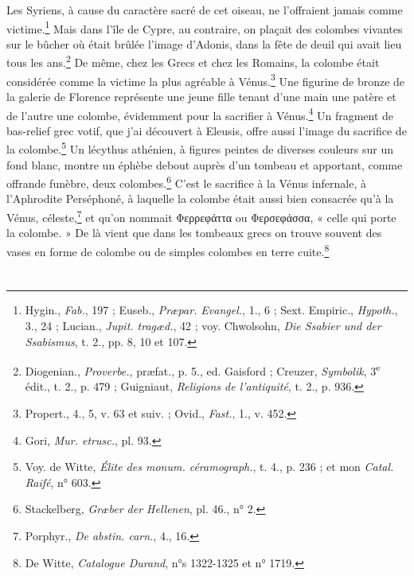 \documentclass[a4paper, 11pt, oneside]{article}
\begin{document}
Les Syriens, à cause du caractère sacré de cet oiseau, ne l'offraient jamais comme victime.\footnote{Hygin., \emph{Fab.}, 197 ; Euseb., \emph{Præpar. Evangel.}, 1., 6 ; Sext. Empiric., \emph{Hypoth.}, 3., 24 ; Lucian., \emph{Jupit. tragæd.}, 42 ; voy. Chwolsohn, \emph{Die Ssabier und der Ssabismus}, t. 2., pp. 8, 10 et 107.} Mais dans l'île de Cypre, au contraire, on plaçait des colombes vivantes sur le bûcher où était brûlée l'image d'Adonis, dans la fête de deuil qui avait lieu tous les ans.\footnote{Diogenian., \emph{Proverbe.}, præfat., p. 5., ed. Gaisford ; Creuzer, \emph{Symbolik}, 3\textsuperscript{e} édit., t. 2., p. 479 ; Guigniaut, \emph{Religions de l'antiquité}, t. 2., p. 936.} De même, chez les Grecs et chez les Romains, la colombe était considérée comme la victime la plus agréable à Vénus.\footnote{Propert., 4., 5, v. 63 et suiv. ; Ovid., \emph{Fast.}, 1., v. 452.} Une figurine de bronze de la galerie de Florence représente une jeune fille tenant d'une main une patère et de l'autre une colombe, évidemment pour la sacrifier à Vénus.\footnote{Gori, \emph{Mur. etrusc.}, pl. 93.} Un fragment de bas-relief grec votif, que j'ai découvert à Eleusis, offre aussi l'image du sacrifice de la colombe.\footnote{Voy. de Witte, \emph{Élite des monum. céramograph.}, t. 4., p. 236 ; et mon \emph{Catal. Raifé}, n° 603.} Un lécythus athénien, à figures peintes de diverses couleurs sur un fond blanc, montre un éphèbe debout auprès d'un tombeau et apportant, comme offrande funèbre, deux colombes.\footnote{Stackelberg, \emph{Græber der Hellenen}, pl. 46., n° 2.} C'est le sacrifice à la Vénus infernale, à l'Aphrodite Perséphoné, à laquelle la colombe était aussi bien consacrée qu'à la Vénus, céleste,\footnote{Porphyr., \emph{De abstin. carn.}, 4., 16.} et qu'on nommait Φερρεφάττα ou Φερσεφάσσα, « celle qui porte la colombe. » De là vient que dans les tombeaux grecs on trouve souvent des vases en forme de colombe ou de simples colombes en terre cuite.\footnote{De Witte, \emph{Catalogue Durand}, n°s 1322-1325 et n° 1719.} 

\bigskip \centerline{\EightStarTaper} \centerline{\EightStarTaper\EightStarTaper} \bigskip\clearpage
\section{}
\end{document}
